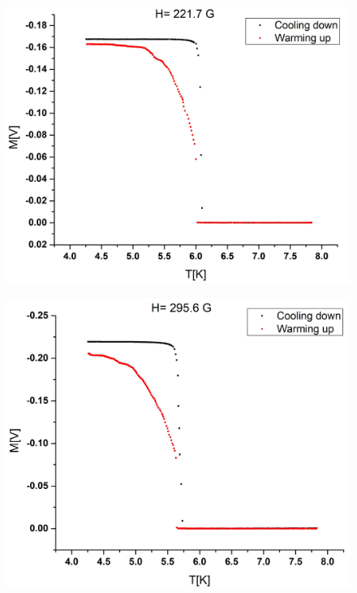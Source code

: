 \documentclass[openany,11pt,a4paper]{report}
\begin{document}
\begin{figure}[H]
\begin{center}
\includegraphics[scale=0.35]{finalthree.jpg}
\end{center}
\end{figure}


\begin{figure}[H]
\begin{center}
\includegraphics[scale=0.35]{finalfour.jpg}
\end{center}
\end{figure}
\end{document}
